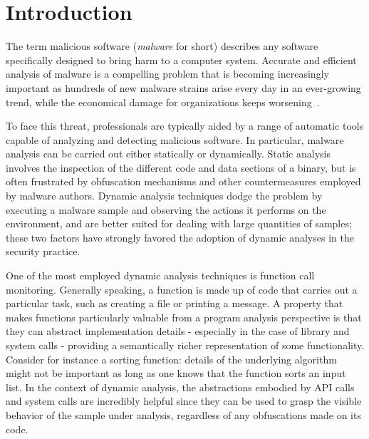 
\chapter{Introduction}

\iffalse
Malwares are a threat

Dynamic analysis is favoured over static analysis

One dynamic analysis technique is API hooking/tracing

Malwares are also evasive

Problem: API hooking and tracing evasive samples

Solution BlueTracer
\fi

The term malicious software (\textit{malware} for short) describes any software specifically designed to bring harm to a computer system. Accurate and efficient analysis of malware is a compelling problem that is becoming increasingly important as hundreds of new malware strains arise every day in an ever-growing trend, while the economical damage for organizations keeps worsening~\cite{Cisco}.

To face this threat, professionals are typically aided by a range of automatic tools capable of analyzing and detecting malicious software. In particular, malware analysis can be carried out either statically or dynamically. Static analysis involves the inspection of the different code and data sections of a binary, but is often frustrated by obfuscation mechanisms and other countermeasures employed by malware authors. Dynamic analysis techniques dodge the problem by executing a malware sample and observing the actions it performs on the environment, and are better suited for dealing with large quantities of samples; these two factors have strongly favored the adoption of dynamic analyses in the security practice.

One of the most employed dynamic analysis techniques is function call monitoring. Generally speaking, a function is made up of code that carries out a particular task, such as creating a file or printing a message. A property that makes functions particularly valuable from a program analysis perspective is that they can abstract implementation details - especially in the case of library and system calls - providing a semantically richer representation of some functionality. Consider for instance a sorting function: details of the underlying algorithm might not be important as long as one knows that the function sorts an input list. In the context of dynamic analysis, the abstractions embodied by API calls and system calls are incredibly helpful since they can be used to grasp the visible behavior of the sample under analysis, regardless of any obfuscations made on its code.

